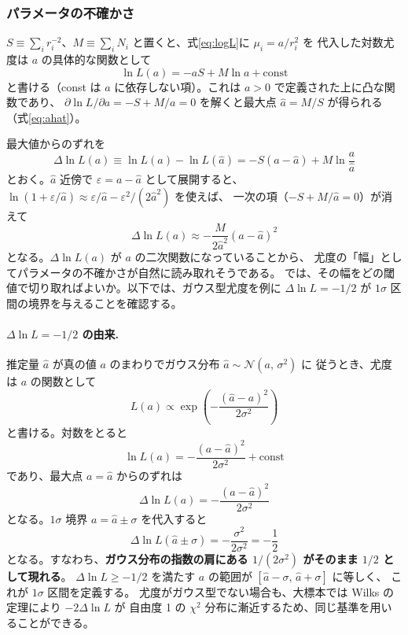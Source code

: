 \documentclass[uplatex,dvipdfmx,12pt,nomag]{jsarticle}
\begin{document}
\subsubsection*{パラメータの不確かさ}

$S \equiv \sum_i r_i^{-2}$、$M \equiv \sum_i N_i$ と置くと、式\eqref{eq:logL}に $\mu_i = a/r_i^2$ を
代入した対数尤度は $a$ の具体的な関数として
\begin{equation}
  \ln L(a) = -aS + M\ln a + \mathrm{const}
  \label{eq:logL-concrete}
\end{equation}
と書ける（const は $a$ に依存しない項）。これは $a > 0$ で定義された上に凸な関数であり、
$\partial \ln L/\partial a = -S + M/a = 0$ を解くと最大点 $\hat{a} = M/S$ が得られる（式\eqref{eq:ahat}）。

最大値からのずれを
\begin{equation}
  \Delta\ln L(a) \equiv \ln L(a) - \ln L(\hat{a})
  = -S(a - \hat{a}) + M\ln\frac{a}{\hat{a}}
\end{equation}
とおく。$\hat{a}$ 近傍で $\varepsilon = a - \hat{a}$ として展開すると、
$\ln(1 + \varepsilon/\hat{a}) \approx \varepsilon/\hat{a} - \varepsilon^2/(2\hat{a}^2)$ を使えば、
一次の項（$-S + M/\hat{a} = 0$）が消えて
\begin{equation}
  \Delta\ln L(a) \approx -\frac{M}{2\hat{a}^2}(a - \hat{a})^2
  \label{eq:dlnL}
\end{equation}
となる。$\Delta\ln L(a)$ が $a$ の二次関数になっていることから、
尤度の「幅」としてパラメータの不確かさが自然に読み取れそうである。
では、その幅をどの閾値で切り取ればよいか。以下では、ガウス型尤度を例に
$\Delta\ln L = -1/2$ が $1\sigma$ 区間の境界を与えることを確認する。

\paragraph{$\Delta\ln L = -1/2$ の由来.}
推定量 $\hat{a}$ が真の値 $a$ のまわりでガウス分布 $\hat{a}\sim\mathcal{N}(a,\,\sigma^2)$ に
従うとき、尤度は $a$ の関数として
\begin{equation}
  L(a) \propto \exp\!\left(-\frac{(\hat{a}-a)^2}{2\sigma^2}\right)
\end{equation}
と書ける。対数をとると
\begin{equation}
  \ln L(a) = -\frac{(a - \hat{a})^2}{2\sigma^2} + \mathrm{const}
\end{equation}
であり、最大点 $a = \hat{a}$ からのずれは
\begin{equation}
  \Delta\ln L(a) = -\frac{(a-\hat{a})^2}{2\sigma^2}
\end{equation}
となる。$1\sigma$ 境界 $a = \hat{a} \pm \sigma$ を代入すると
\begin{equation}
  \Delta\ln L(\hat{a}\pm\sigma) = -\frac{\sigma^2}{2\sigma^2} = -\frac{1}{2}
\end{equation}
となる。すなわち、\textbf{ガウス分布の指数の肩にある $1/(2\sigma^2)$ がそのまま $1/2$ として現れる}。
$\Delta\ln L \geq -1/2$ を満たす $a$ の範囲が $[\hat{a}-\sigma,\,\hat{a}+\sigma]$ に等しく、
これが $1\sigma$ 区間を定義する。
尤度がガウス型でない場合も、大標本では Wilks の定理により $-2\Delta\ln L$ が
自由度 1 の $\chi^2$ 分布に漸近するため、同じ基準を用いることができる。
\end{document}
